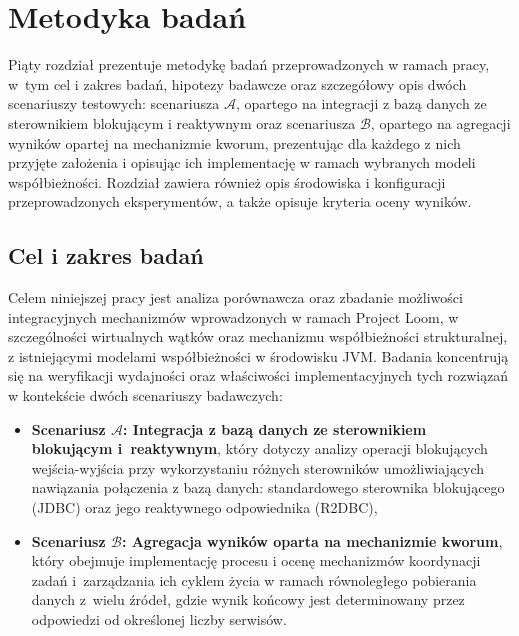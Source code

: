 \chapter{Metodyka badań}

Piąty rozdział prezentuje metodykę badań przeprowadzonych w ramach pracy, w~tym cel i zakres badań, hipotezy badawcze oraz szczegółowy opis dwóch scenariuszy testowych: scenariusza $\mathcal{A}$, opartego na integracji z bazą danych ze sterownikiem blokującym i reaktywnym oraz scenariusza $\mathcal{B}$, opartego na agregacji wyników opartej na mechanizmie kworum, prezentując dla każdego z nich przyjęte założenia i opisując ich implementację w ramach wybranych modeli współbieżności. Rozdział zawiera również opis środowiska i konfiguracji przeprowadzonych eksperymentów, a także opisuje kryteria oceny wyników.

\section{Cel i zakres badań}
\label{sec:research-purposes}

Celem niniejszej pracy jest analiza porównawcza oraz zbadanie możliwości integracyjnych mechanizmów wprowadzonych w ramach Project Loom, w szczególności wirtualnych wątków oraz mechanizmu współbieżności strukturalnej, z istniejącymi modelami współbieżności w środowisku JVM. Badania koncentrują się na weryfikacji wydajności oraz właściwości implementacyjnych tych rozwiązań w kontekście dwóch scenariuszy badawczych:
\begin{itemize}
    \itemsep0em
    \item \textbf{Scenariusz $\mathcal{A}$: Integracja z bazą danych ze sterownikiem blokującym i~reaktywnym}, który dotyczy analizy operacji blokujących wejścia-wyjścia przy wykorzystaniu różnych sterowników umożliwiających nawiązania połączenia z bazą danych: standardowego sterownika blokującego (JDBC) oraz jego reaktywnego odpowiednika (R2DBC),
    
    \item \textbf{Scenariusz $\mathcal{B}$: Agregacja wyników oparta na mechanizmie kworum}, który obejmuje implementację procesu i ocenę mechanizmów koordynacji zadań i~zarządzania ich cyklem życia w ramach równoległego pobierania danych z~wielu źródeł, gdzie wynik końcowy jest determinowany przez odpowiedzi od określonej liczby serwisów.
\end{itemize}


